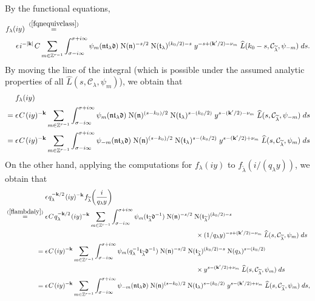 \documentclass[11pt]{amsart}
\theoremstyle{remark}
\newcommand\mbf[1]{\mathbf{#1}}
\newcommand\cl[1]{\mathcal{#1}}
\newcommand\fr[1]{\mathfrak{#1}}
\newcommand\wt[1]{\widetilde{#1}}
\newcommand\wh[1]{\widehat{#1}}
\newcommand{\inte}{\mathbb{Z}}
\newcommand{\eq}{\;=\;}
\def\thin{{\hskip 1pt}}
\newcommand{\N}{\mathrm{N}}
\begin{document}
By the functional equations,
\begin{align*}
    &f_\lambda(iy)\;\stackrel{(\ref{fqnequivclass})}{=}\; \\
    &\hspace{0.5cm}\epsilon\thin i^{-|\mbf{k}|}\thin C\sum_{m\in\inte^{r-1}}\int_{\sigma-i\infty}^{\sigma+i\infty}\psi_m(\fr{n}\fr{t}_\lambda\fr{d})\;\N(\fr{n})^{-s/2}\;\N(\fr{t}_\lambda)^{(k_0/2)-s}\; y^{-s+(\mbf{k}^\prime/2)-\nu_m}\;\wh{L}(k_0-s,\cl{C}_{\wt{\lambda}},\psi_{-m})\; ds.
\end{align*}
By moving the line of the integral (which is possible under the assumed analytic properties of all $\wh{L}(s,\cl{C}_\lambda,\psi_m)$), we obtain that
\begin{align*}
    &f_\lambda(iy)\\
    \eq&\epsilon\thin C\thin (iy)^{-\mbf{k}}\sum_{m\in\inte^{r-1}}\int_{\sigma-i\infty}^{\sigma+i\infty}\psi_m(\fr{n}\fr{t}_\lambda\fr{d})\;\N(\fr{n})^{(s-k_0)/2}\;\N(\fr{t}_\lambda)^{s-(k_0/2)}\;y^{s-(\mbf{k}^\prime/2)-\nu_m}\;\wh{L}(s,\cl{C}_{\wt{\lambda}},\psi_{-m})\; ds \\
    \eq&\epsilon\thin C\thin (iy)^{-\mbf{k}}\sum_{m\in\inte^{r-1}}\int_{\sigma-i\infty}^{\sigma+i\infty}\psi_{-m}(\fr{n}\fr{t}_\lambda\fr{d})\;\N(\fr{n})^{(s-k_0)/2}\;\N(\fr{t}_\lambda)^{s-(k_0/2)}\;y^{s-(\mbf{k}^\prime/2)+\nu_m}\;\wh{L}(s,\cl{C}_{\wt{\lambda}},\psi_m)\; ds
\end{align*}
On the other hand, applying the computations for $f_\lambda(iy)$ to $f_{\wt{\lambda}}(i/(q_\lambda y))$, we obtain that
\begin{align*}
    &\epsilon\thin q_\lambda^{-\mbf{k}/2}\thin (iy)^{-\mbf{k}}\thin f_{\wt{\lambda}}\bigg(\frac{i}{q_\lambda y}\bigg)\\
    \;\stackrel{(\ref{flambdaiy})}{=}\;&\epsilon\thin C\thin q_\lambda^{-\mbf{k}/2}\thin(iy)^{-\mbf{k}}\sum_{m\in\inte^{r-1}}\int_{\sigma-i\infty}^{\sigma+i\infty}\psi_{m}(\fr{t}_{\wt{\lambda}}\fr{d}^{-1})\;\N(\fr{n})^{-s/2}\;\N(\fr{t}_{\wt{\lambda}})^{(k_0/2)-s} \\
    &\hspace{8cm}\times(1/q_\lambda y)^{-s+(\mbf{k}^\prime/2)-\nu_m}\;\wh{L}(s,\cl{C}_{\wt{\lambda}},\psi_m)\; ds \\
    \eq&\epsilon\thin C\thin(iy)^{-\mbf{k}}\sum_{m\in\inte^{r-1}}\int_{\sigma-i\infty}^{\sigma+i\infty}\psi_{m}(q_\lambda^{-1}\fr{t}_{\wt{\lambda}}\fr{d}^{-1})\;\N(\fr{n})^{-s/2}\;\N(\fr{t}_{\wt{\lambda}})^{(k_0/2)-s}\;\N(q_\lambda)^{s-(k_0/2)} \\
    &\hspace{8cm}\times y^{s-(\mbf{k}^\prime/2)+\nu_m}\;\wh{L}(s,\cl{C}_{\wt{\lambda}},\psi_m)\; ds \\
    \eq&\epsilon\thin C\thin(iy)^{-\mbf{k}}\sum_{m\in\inte^{r-1}}\int_{\sigma-i\infty}^{\sigma+i\infty}\psi_{-m}(\fr{n}\fr{t}_\lambda\fr{d})\;\N(\fr{n})^{(s-k_0)/2}\;\N(\fr{t}_\lambda)^{s-(k_0/2)}\;y^{s-(\mbf{k}^\prime/2)+\nu_m}\;\wh{L}(s,\cl{C}_{\wt{\lambda}},\psi_m)\; ds,
\end{align*}
\end{document}
